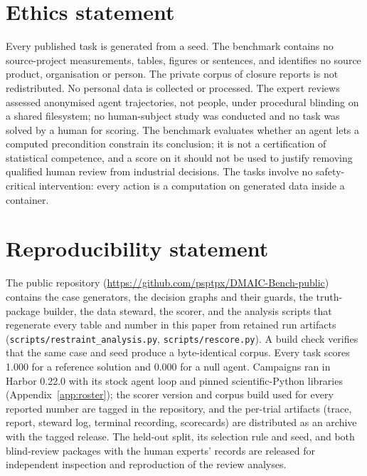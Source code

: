 \documentclass{article}
\begin{document}
\section*{Ethics statement}
Every published task is generated from a seed. The benchmark contains no source-project measurements, tables, figures or sentences, and identifies no source product, organisation or person. The private corpus of closure reports is not redistributed. No personal data is collected or
processed. The expert reviews assessed anonymised agent trajectories, not people, under
procedural blinding on a shared filesystem; no human-subject study was conducted and no
task was solved by a human for scoring. The benchmark evaluates whether an agent lets a
computed precondition constrain its conclusion; it is not a certification of statistical
competence, and a score on it should not be used to justify removing qualified human
review from industrial decisions. The tasks involve no safety-critical intervention: every
action is a computation on generated data inside a container.

\section*{Reproducibility statement}
The public repository ({\url{https://github.com/psptpx/DMAIC-Bench-public}}) contains the case generators, the decision graphs and their
guards, the truth-package builder, the data steward, the scorer, and the analysis scripts
that regenerate every table and number in this paper from retained run artifacts
(\nolinkurl{scripts/restraint_analysis.py}, \nolinkurl{scripts/rescore.py}). A build check verifies that the same case and seed produce a byte-identical corpus. Every task scores 1.000 for a reference solution and 0.000 for a null agent. Campaigns ran in Harbor 0.22.0
with its stock agent loop and pinned scientific-Python libraries (Appendix~\ref{app:roster});
the scorer version and corpus build used for every reported number are tagged in the
repository, and the per-trial artifacts (trace, report, steward log, terminal recording,
scorecards) are distributed as an archive with the tagged release. The held-out split, its
selection rule and seed, and both blind-review packages with the human experts' records are released for independent inspection and reproduction of the review analyses.

\clearpage



\clearpage
\appendix
{}
\renewcommand{\contentsname}{Contents of Appendix}
{\setlength{\parskip}{0pt}\tableofcontents}
\clearpage
\raggedbottom
\setlength{\parskip}{4pt plus 1pt minus 1pt}
\setlength{\floatsep}{6pt plus 1pt minus 1pt}
\setlength{\textfloatsep}{6pt plus 1pt minus 1pt}
\setlength{\intextsep}{6pt plus 1pt minus 1pt}
\captionsetup[table]{position=top,skip=6pt,font=normalsize}
\makeatletter
\setlength{\@fptop}{0pt}
\setlength{\@fpsep}{12pt}
\setlength{\@fpbot}{0pt plus 1fil}
\makeatother
\renewcommand{\topfraction}{0.9}
\renewcommand{\bottomfraction}{0.8}
\renewcommand{\textfraction}{0.08}
\renewcommand{\floatpagefraction}{0.75}
\end{document}
